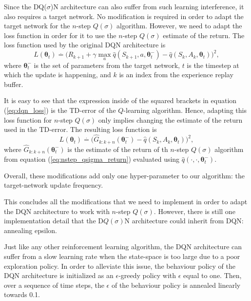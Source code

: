 Since the DQ($\sigma$)N architecture can also suffer from such learning interference, it also requires a target network.
No modification is required in order to adapt the target network for the $n$-step $Q(\sigma)$ algorithm.
However, we need to adapt the loss function in order for it to use the $n$-step $Q(\sigma)$ estimate of the return.
The loss function used by the original DQN architecture is
%
\begin{equation}
\label{eq:dqn_loss}
L(\boldsymbol\theta_t) \overset{.}{=} \big( R_{k+1} 
	+ \gamma \max_a \hat{q}(S_{k+1}, a, \boldsymbol\theta^-_t)
	- \hat{q}(S_k, A_k, \boldsymbol\theta_t) \big)^2,
\end{equation}
%
where $\boldsymbol\theta^-_t$ is the set of parameters from the target network, $t$ is the timestep at which the update is happening, and $k$ is an index from the experience replay buffer. 

It is easy to see that the expression inside of the squared brackets in equation (\ref{eq:dqn_loss}) is the TD-error of the $Q$-learning algorithm.
Hence, adapting this loss function for $n$-step $Q(\sigma)$ only implies changing the estimate of the return used in the TD-error.
The resulting loss function is
%
\begin{equation}
\label{eq:dqsigman_loss}
L(\boldsymbol\theta_t) \overset{.}{=} \big( \hat{G}_{k:k+n}(\boldsymbol\theta^-_t)
	- \hat{q}(S_k, A_k, \boldsymbol\theta_t) \big)^2,
\end{equation}
%
where $\hat{G}_{k:k+n}(\boldsymbol\theta^-_t)$ is the estimate of the return of th $n$-step $Q(\sigma)$ algorithm from equation (\ref{eq:nstep_qsigma_return}) evaluated using $\hat{q}(\cdot, \cdot,\boldsymbol\theta^-_t)$.

Overall, these modifications add only one hyper-parameter to our algorithm: the target-network update frequency.

This concludes all the modifications that we need to implement in order to adapt the DQN architecture to work with $n$-step $Q(\sigma)$.
However, there is still one implementation detail that the D$Q(\sigma)$N architecture could inherit from DQN: annealing epsilon.

Just like any other reinforcement learning algorithm, the DQN architecture can suffer from a slow learning rate when the state-space is too large due to a poor exploration policy.
In order to alleviate this issue, the behaviour policy of the DQN architecture is initialized as an $\epsilon$-greedy policy with $\epsilon$ equal to one. 
Then, over a sequence of time steps, the $\epsilon$ of the behaviour policy is annealed linearly towards 0.1.

